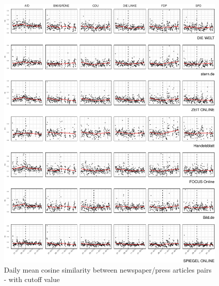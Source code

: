 \documentclass[
  12pt,
]{article}
\begin{document}
\begin{figure}

{\centering \includegraphics[width=1\linewidth]{chap1_files/figure-latex/Daily mean cosine similarity - cutoff value-1} 

}

\caption{Daily mean cosine similarity between newspaper/press articles pairs - with cutoff value \label{fig:mean_cosine_sim_rd}}\label{fig:Daily mean cosine similarity - cutoff value}
\end{figure}
\end{document}
